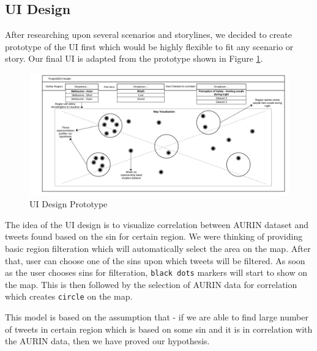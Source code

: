 \subsection{UI Design}

After researching upon several scenarios and storylines, we decided to create prototype of the UI first which would be highly flexible to fit any scenario or story. Our final UI is adapted from the prototype shown in Figure \ref{fig:uidesignprototype}.


\begin{figure}[H]
    \centering
    \includegraphics[width=16cm,keepaspectratio=true]{images/uiarchitecture.png}
    \caption{UI Design Prototype}
    \label{fig:uidesignprototype}
\end{figure}

The idea of the UI design is to visualize correlation between AURIN dataset and tweets found based on the sin for certain region. We were thinking of providing basic region filteration which will automatically select the area on the map. After that, user can choose one of the sins upon which tweets will be filtered. As soon as the user chooses sins for filteration, \texttt{black dots} markers will start to show on the map. This is then followed by the selection of AURIN data for correlation which creates \texttt{circle} on the map. 

This model is based on the assumption that - if we are able to find large number of tweets in certain region which is based on some sin and it is in correlation with the AURIN data, then we have proved our hypothesis.